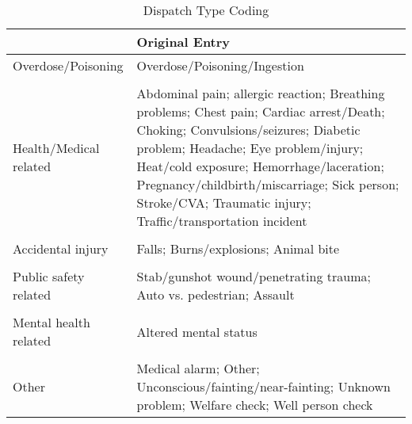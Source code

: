 \begin{table}[htbp] \centering
\def\sym#1{\ifmmode^{#1}\else\(^{#1}\)\fi}
  \caption{Dispatch Type Coding} %
  \begin{adjustbox}{max width=\linewidth}\begin{tabular}{p{6cm} p{10cm}}
    \toprule
     & Original Entry \\ 
    \midrule
    Overdose/Poisoning & Overdose/Poisoning/Ingestion \\
    \vspace{.05em} \\
    Health/Medical related & Abdominal pain; allergic reaction; Breathing problems; Chest pain; Cardiac arrest/Death; Choking; Convulsions/seizures; Diabetic problem; Headache; Eye problem/injury; Heat/cold exposure; Hemorrhage/laceration; Pregnancy/childbirth/miscarriage; Sick person; Stroke/CVA; Traumatic injury; Traffic/transportation incident \\
    \vspace{.05em} \\
    Accidental injury & Falls; Burns/explosions; Animal bite \\
    \vspace{.05em} \\
    Public safety related & Stab/gunshot wound/penetrating trauma; Auto vs. pedestrian; Assault \\
    \vspace{.05em} \\
    Mental health related & Altered mental status \\
    \vspace{.05em} \\
    Other & Medical alarm; Other; Unconscious/fainting/near-fainting; Unknown problem; Welfare check; Well person check \\
    \bottomrule
\end{tabular} \end{adjustbox}
\end{table}
